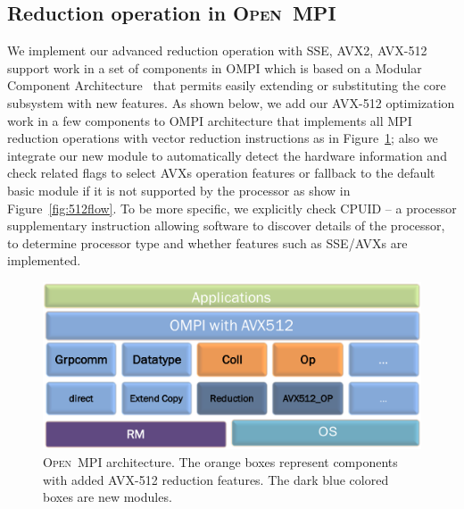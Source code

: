 \documentclass[sigconf,review]{acmart}
\newcommand{\ompi}[0]{\textsc{Open~MPI}\xspace}
\begin{document}
\subsection{Reduction operation in \ompi}
We implement our advanced reduction operation with SSE, AVX2, AVX-512 support work
in a set of components in OMPI which is based on a Modular Component
Architecture~\cite{dong_prrte} that permits easily extending or substituting the core subsystem with new features.
As shown below, we add our AVX-512 optimization work in a few components to OMPI
architecture that implements all MPI reduction operations with vector reduction instructions as in Figure~\ref{fig:avx_mca}; also we integrate our new module to
automatically detect the hardware information and check related flags to select AVXs operation
features or fallback to the default basic module if it is not supported by the
processor as show in Figure~\ref{fig:512flow}. To be more specific, we explicitly check CPUID -- a processor
supplementary instruction allowing software to discover details of the processor, to
determine processor type and whether features such as SSE/AVXs are implemented.

\begin{figure}[h]
    \centering
    \includegraphics[width=\linewidth]{avx-mca.pdf}
    \caption{\ompi architecture. The orange boxes represent components with added AVX-512 reduction features. The dark blue colored boxes are new modules.}
    \label{fig:avx_mca}
\end{figure}
\end{document}
